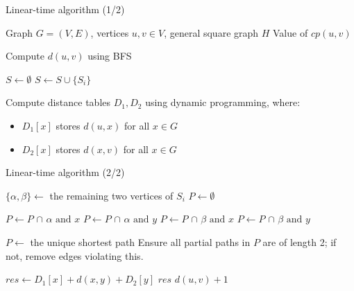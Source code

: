 \documentclass [xcolor=svgnames, t] {beamer}
\begin{document}
\begin{frame}{Linear-time algorithm (1/2)}
    \begin{algorithm}[H]
    \tiny
\caption{Linear-time algorithm for computing \(cp(u,v)\) in a graph with the \textbf{diam or cut 2} property and \(H\) as a general square graph}
\begin{algorithmic}[1]
\Require Graph \(G=(V,E)\), vertices \(u,v \in V\), general square graph \(H\)
\Ensure Value of \(cp(u,v)\)

\State Compute \(d(u,v)\) using BFS


\State \(S \gets \emptyset\)
    \State \(S \gets S \cup \{S_i\}\)
\EndFor

\State Compute distance tables \(D_1, D_2\) using dynamic programming, where:
\begin{itemize}
    \item \(D_1[x]\) stores \(d(u,x)\) for all \(x \in  G\)
    \item \(D_2[x]\) stores \(d(x,v)\) for all \(x \in G\)
\end{itemize}
\end{algorithmic}
\end{algorithm}
\end{frame}
\begin{frame}{Linear-time algorithm (2/2)}
    \begin{algorithm}[H]
    \tiny
\caption{Linear-time algorithm for computing \(cp(u,v)\) in a graph with the \textbf{diam or cut 2} property and \(H\) as a general square graph}
\begin{algorithmic}[1]
        \State \(\{\alpha, \beta\} \gets\) the remaining two vertices of \(S_i\)
        \State \(P \gets \emptyset\) 


      \State \( P \leftarrow P\) \(\cap \)  \( \alpha \text{ and } x \)
      \State \( P \leftarrow P\) \(\cap \)  \( \alpha \text{ and } y \)
      \State \( P \leftarrow P\) \(\cap \)  \(\beta \text{ and } x \)
      \State \( P \leftarrow P\) \(\cap \)  \( \beta \text{ and } y \)

            \State \(P \gets\) the unique shortest path
        \Else
            \State Ensure all partial paths in \(P\) are of length 2; if not, remove edges violating this.
        \EndIf

                \State \(res \gets D_1[x] + d(x,y) + D_2[y]\)
                    \State \Return \(res\)
                \EndIf
            \EndIf
        \EndFor
    \EndFor
\EndFor
\State \Return \(d(u,v) + 1\)
\end{algorithmic}
\end{algorithm}
\end{frame}
\end{document}
